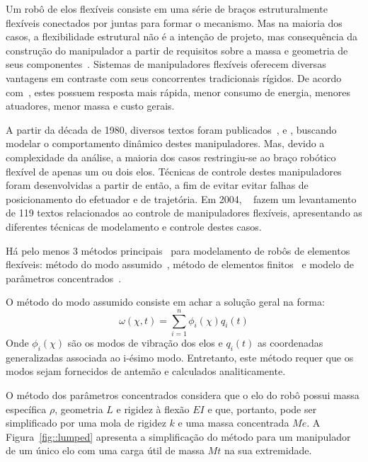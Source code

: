 Um robô de elos flexíveis consiste em uma série de braços estruturalmente
flexíveis conectados por juntas para formar o mecanismo. Mas na maioria dos
casos, a flexibilidade estrutural não é a intenção de projeto, mas consequência
da construção do manipulador a partir de requisitos sobre a massa e geometria de
seus componentes~\cite{moallem2000flexible}.
Sistemas de manipuladores flexíveis oferecem diversas vantagens em contraste com
seus concorrentes tradicionais rígidos. De acordo com~\cite{tokhi2008flexible},
estes possuem resposta mais rápida, menor consumo de energia, menores atuadores,
menor massa e custo gerais.


A partir da década de 1980, diversos textos foram
publicados~\cite{sunada1983dynamic}, \cite{bayo1987finite} e
\cite{yang1988dynamic}, buscando modelar o comportamento dinâmico destes
manipuladores. Mas, devido a complexidade da análise, a maioria dos casos
restringiu-se ao braço robótico flexível de apenas um ou dois elos. Técnicas de
controle destes manipuladores foram desenvolvidas a partir de então, a fim de
evitar evitar falhas de posicionamento do efetuador e de trajetória.
Em 2004, ~\citet{benosman2004control} fazem um levantamento de 119 textos
relacionados ao controle de manipuladores flexíveis, apresentando as diferentes
técnicas de modelamento e controle destes casos.

Há pelo menos 3 métodos principais~\cite{dwivedy2006dynamic} para modelamento de
robôs de elementos flexíveis: método do modo
assumido~\cite{robinett2012flexible}, método de elementos
finitos~\cite{bricout1990finite} e modelo de parâmetros
concentrados~\cite{zhu1999simulation}.

O método do modo assumido consiste em achar a solução geral na forma:
%
\begin{equation}
	\omega (\chi ,t) = \sum_{i=1}^{n}\phi_i(\chi ) q_i(t)
\end{equation}
%
Onde $\phi_i(\chi)$ são os modos de vibração dos elos e $q_i(t)$ as coordenadas
generalizadas associada ao i-ésimo modo. Entretanto, este método requer que os
modos sejam fornecidos de antemão e calculados analiticamente.

O método dos parâmetros concentrados considera que o elo do robô possui massa
específica $\rho$, geometria $L$ e rigidez à flexão $EI$ e que, portanto, pode
ser simplificado por uma mola de rigidez $k$ e uma massa concentrada $Me$. A
Figura~\ref{fig::lumped} apresenta a simplificação do método para um manipulador
de um único elo com uma carga útil de massa $Mt$ na sua extremidade.

